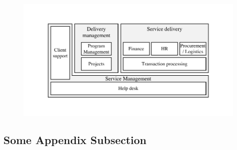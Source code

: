 		\begin{figure}[caption={Outsourcing provider processes}, label={fig:scheweproc}]
	{	\includegraphics[width=.8\textwidth]{figures/scheweproc.pdf}}
		\hspace{6.2cm}	\citep[]{schewe2007}
\end{figure}

\subsection{Some Appendix Subsection}

\lipsum[10]